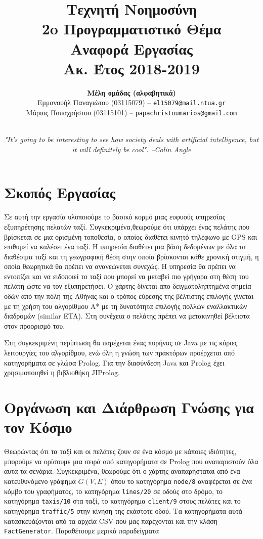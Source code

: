 \documentclass[a4paper,12pt]{article}
\title{ \textbf{Τεχνητή Νοημοσύνη}  \\ 2o Προγραμματιστικό Θέμα \\ Αναφορά Εργασίας \\ \small{Ακ. Έτος 2018-2019}}
\author{\textbf{Μέλη ομάδας (αλφαβητικά)} \\ Εμμανουήλ Παναγιώτου (03115079) -- \texttt{el15079@mail.ntua.gr} \\  Μάριος Παπαχρήστου (03115101) -- \texttt{papachristoumarios@gmail.com} \\ \noindent\rule{0.9\textwidth}{1pt}}
\date{\emph{"It's going to be interesting to see how society deals with artificial intelligence, but it will definitely be cool". --Colin Angle}}
\begin{document}
\maketitle

\section{Σκοπός Εργασίας} 

Σε αυτή την εργασία υλοποιούμε το βασικό κορμό μιας ευφυούς υπηρεσίας εξυπηρέτησης πελατών ταξί. Συγκεκριμένα,θεωρούμε ότι υπάρχει ένας πελάτης που βρίσκεται σε μια ορισμένη τοποθεσία, ο οποίος διαθέτει κινητό τηλέφωνο με GPS και επιθυμεί να καλέσει ένα ταξί. Η υπηρεσία διαθέτει μια βάση δεδομένων με όλα τα διαθέσιμα ταξί και τη γεωγραφική θέση στην
οποία βρίσκονται κάθε χρονική στιγμή, η οποία θεωρητικά θα πρέπει να ανανεώνεται συνεχώς. Η υπηρεσία θα πρέπει να εντοπίζει και να ειδοποιεί το ταξί που μπορεί να μεταβεί πιο γρήγορα στη θέση του πελάτη ώστε να τον εξυπηρετήσει. Ο χάρτης δίνεται απο δειγματοληπτημένα σημεία οδών από την πόλη της Αθήνας και ο τρόπος εύρεσης της βέλτιστης επιλογής γίνεται με τη χρήση του αλγορίθμου Α* με τη δυνατότητα επιλογής πολλών εναλλακτικών διαδρομών (similar ETA).  Στη συνέχεια ο πελάτης πρέπει να μετακινηθεί βέλτιστα στον προορισμό του.

Στη συγκεκριμένη περίπτωση θα παρέχεται ένας πυρήνας σε Java με τις κύριες λειτουργίες του αλγορίθμου, ενώ όλη η γνώση των πρακτόρων προέρχεται από κατηγορήματα σε γλώσα Prolog. Για την διασύνδεση Java και Prolog έχει χρησιμοποιηθεί η βιβλιοθήκη JIProlog. 

\section{Οργάνωση και Διάρθρωση Γνώσης για τον Κόσμο} 

Θεωρώντας ότι τα ταξί και οι πελάτες ζουν σε ένα κόσμο με κάποιες ιδιότητες, μπορούμε να ορίσουμε μια σειρά από κατηγορήματα σε Prolog που αναπαριστούν όλα αυτά τα σενάρια. Συγκεκριμένα, θεωρούμε ότι ο χάρτης αναπαρήσταται από ένα κατευθυνόμενο γράφημα $G(V, E)$ όπου το κατηγόρημα \texttt{node/8} αναφέρεται σε ένα κόμβο του γραφήματος, το κατηγόρημα \texttt{lines/20} σε οδούς στο δρόμο, το κατηγόρημα \texttt{taxis/10} στα ταξί, το κατηγόρημα \texttt{client/9} στους πελάτες και το κατηγόρημα \texttt{traffic/5} στην κίνηση της εκάστοτε οδού. Τα κατηγορήματα αυτά κατασκευάζονται από τα αρχεία CSV που μας παρέχονται και την κλάση \texttt{FactGenerator}. Παραθέτουμε μερικά παραδείγματα
\end{document}
